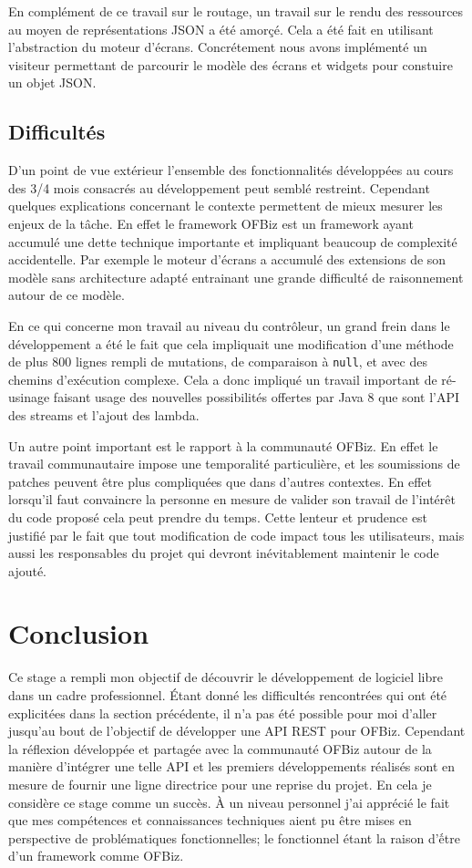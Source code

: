 \documentclass[a4paper, 11pt]{report}
\begin{document}
En complément de ce travail sur le routage, un travail sur le rendu
des ressources au moyen de représentations JSON a été amorçé. Cela a
été fait en utilisant l'abstraction du moteur d'écrans. Concrétement
nous avons implémenté un visiteur \cite{gamma1993design} permettant de
parcourir le modèle des écrans et widgets pour constuire un objet
JSON.

\section{Difficultés}

D'un point de vue extérieur l'ensemble des fonctionnalités développées
au cours des 3/4 mois consacrés au développement peut semblé
restreint.  Cependant quelques explications concernant le contexte
permettent de mieux mesurer les enjeux de la tâche. En effet le
framework OFBiz est un framework ayant accumulé une dette technique
importante et impliquant beaucoup de complexité accidentelle. Par
exemple le moteur d'écrans a accumulé des extensions de son modèle
sans architecture adapté entrainant une grande difficulté de
raisonnement autour de ce modèle.

En ce qui concerne mon travail au niveau du contrôleur, un grand frein
dans le développement a été le fait que cela impliquait une
modification d'une méthode de plus 800 lignes rempli de mutations, de
comparaison à \verb=null=, et avec des chemins d'exécution
complexe. Cela a donc impliqué un travail important de ré-usinage
faisant usage des nouvelles possibilités offertes par Java 8 que sont
l'API des streams et l'ajout des lambda.

Un autre point important est le rapport à la communauté OFBiz. En
effet le travail communautaire impose une temporalité particulière, et
les soumissions de patches peuvent être plus compliquées que dans
d'autres contextes.  En effet lorsqu'il faut convaincre la personne en
mesure de valider son travail de l'intérêt du code proposé cela peut
prendre du temps. Cette lenteur et prudence est justifié par le fait
que tout modification de code impact tous les utilisateurs, mais aussi
les responsables du projet qui devront inévitablement maintenir le
code ajouté.

\chapter{Conclusion}

Ce stage a rempli mon objectif de découvrir le développement de
logiciel libre dans un cadre professionnel. Étant donné les
difficultés rencontrées qui ont été explicitées dans la section
précédente, il n'a pas été possible pour moi d'aller jusqu'au bout de
l'objectif de développer une API REST pour OFBiz. Cependant la
réflexion développée et partagée avec la communauté OFBiz autour de la
manière d'intégrer une telle API et les premiers développements
réalisés sont en mesure de fournir une ligne directrice pour une
reprise du projet. En cela je considère ce stage comme un succès. À un
niveau personnel j'ai apprécié le fait que mes compétences et
connaissances techniques aient pu être mises en perspective de
problématiques fonctionnelles; le fonctionnel étant la raison d'ếtre
d'un framework comme OFBiz.

\clearpage


\end{document}
